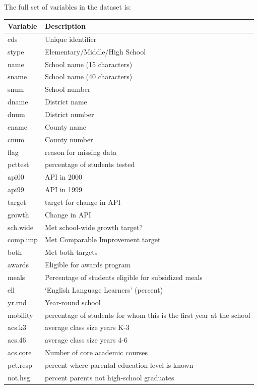 \documentclass[
]{book}
\begin{document}
The full set of variables in the dataset is:

\begin{table}
\centering
\begin{tabular}[t]{l|l}
\hline
Variable & Description\\
\hline
cds & Unique identifier\\
\hline
stype & Elementary/Middle/High School\\
\hline
name & School name (15 characters)\\
\hline
sname & School name (40 characters)\\
\hline
snum & School number\\
\hline
dname & District name\\
\hline
dnum & District number\\
\hline
cname & County name\\
\hline
cnum & County number\\
\hline
flag & reason for missing data\\
\hline
pcttest & percentage of students tested\\
\hline
api00 & API in 2000\\
\hline
api99 & API in 1999\\
\hline
target & target for change in API\\
\hline
growth & Change in API\\
\hline
sch.wide & Met school-wide growth target?\\
\hline
comp.imp & Met Comparable Improvement target\\
\hline
both & Met both targets\\
\hline
awards & Eligible for awards program\\
\hline
meals & Percentage of students eligible for subsidized meals\\
\hline
ell & ‘English Language Learners’ (percent)\\
\hline
yr.rnd & Year-round school\\
\hline
mobility & percentage of students for whom this is the first year at the school\\
\hline
acs.k3 & average class size years K-3\\
\hline
acs.46 & average class size years 4-6\\
\hline
acs.core & Number of core academic courses\\
\hline
pct.resp & percent where parental education level is known\\
\hline
not.hsg & percent parents not high-school graduates\\

\end{tabular}
\end{table}
\end{document}
